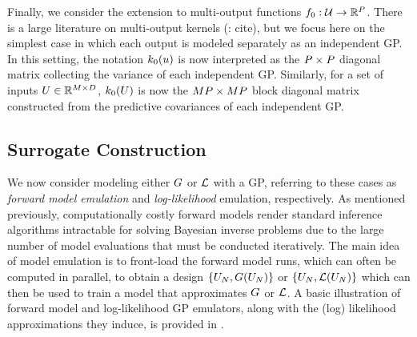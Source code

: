 \documentclass[12pt]{article}
\begin{document}
Finally, we consider the extension to multi-output functions $f_{0}: \mathcal{U} \to \mathbb{R}^{P}$. There is a large literature on multi-output 
kernels (\todo: cite), but we focus here on the simplest case in which each output is modeled separately as an independent GP. 
In this setting, the notation $k_0(u)$ is now interpreted as the $P \times P$ diagonal matrix collecting the variance of each 
independent GP. Similarly, for a set of inputs $U \in \mathbb{R}^{M \times D}$, $k_0(U)$ is now the 
$MP \times MP$ block diagonal matrix constructed from the predictive covariances of each independent GP. 

\subsection{Surrogate Construction}
We now consider modeling either $G$ or $\mathcal{L}$ with a GP, referring to these cases as \textit{forward model emulation} and 
\textit{log-likelihood} emulation, respectively. As mentioned previously, computationally costly forward models render 
standard inference algorithms intractable for solving Bayesian inverse problems due to the large number of model 
evaluations that must be conducted iteratively. The main idea of model emulation is to front-load the forward model 
runs, which can often be computed in parallel, to obtain a design $\{U_{N}, G(U_{N})\}$ or 
$\{U_{N}, \mathcal{L}(U_{N})\}$ which can then be used to train a model that 
approximates $G$ or $\mathcal{L}$. A basic illustration of forward model and log-likelihood GP emulators, along with the 
(log) likelihood approximations they induce, is provided in . 
\end{document}
